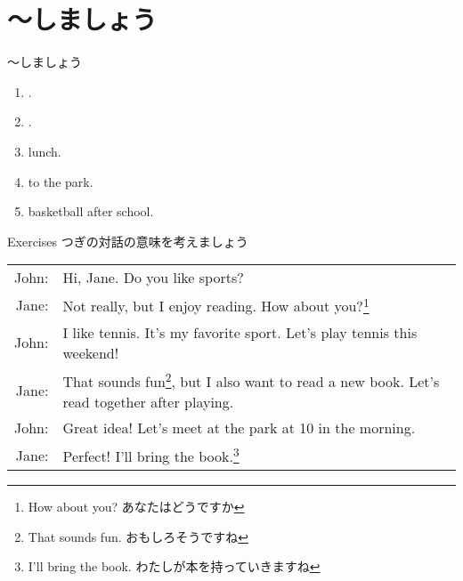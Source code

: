 \documentclass[aspectratio=169,xcolor={dvipsnames,table}]{beamer}
\begin{document}
\section{～しましょう}
\begin{frame}[plain]{～しましょう}
 \begin{enumerate}
  \item<1->  .
  \item<2->  .
  \item<3->   lunch. 
  \item<4->   to the park.
  \item<5->   basketball after school.
 \end{enumerate}

\hfill{}
\end{frame}
\begin{frame}[plain]{Exercises}
つぎの対話の意味を考えましょう\hfill{}


\begin{tabular}{rp{}}
John:& Hi, Jane. Do you like sports?\\
Jane:& Not really, but I enjoy reading. How about you?\footnote{How about you? あなたはどうですか}\\
John:& I like tennis. It's my favorite sport. Let's play tennis this weekend!\\
Jane:& That sounds fun\footnote{That sounds fun. おもしろそうですね}, but I also want to read a new book. Let's read together after playing.\\
John:& Great idea! Let's meet at the park at 10 in the morning.\\
Jane:& Perfect! I'll bring the book.\footnote{I'll bring the book. わたしが本を持っていきますね}
\end{tabular}
\end{frame}
\end{document}
